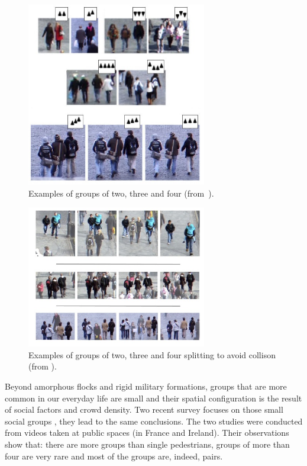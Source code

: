 \documentclass[a4paper,titlepage]{article}
\begin{document}
\begin{figure}[h]
\centering
\includegraphics[width=0.7\textwidth]{SocialGroups.jpg}
\caption{Examples of groups of two, three and four (from~\cite{Peters:2009kx}).}
\label{fig:social_groups}
\end{figure}

\begin{figure}[h]
\centering
\includegraphics[width=0.7\textwidth]{SocialGroupsSplitting.jpg}
\caption{Examples of groups of two, three and four splitting to avoid collison (from \cite{Peters:2009kx}).}
\label{fig:social_groups_splitting}
\end{figure}

Beyond amorphous flocks and rigid military formations, groups that are more common in our everyday life are small and their spatial configuration is the result of social factors and crowd density. Two recent survey focuses on those small social groups \cite{Peters:2009kx,Moussaid:2010ib}, they lead to the same conclusions.
The two studies were conducted from videos taken at public spaces (in France and Ireland). Their observations show that: there are more groups than single pedestrians, groups of more than four are very rare and most of the groups are, indeed, pairs.
\end{document}
